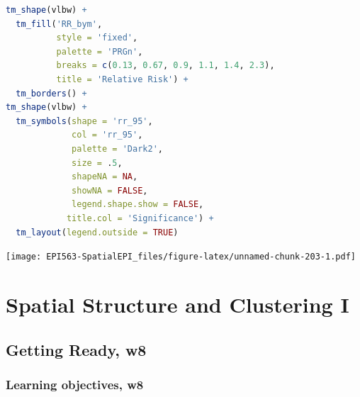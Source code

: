 \documentclass[
]{book}
\begin{document}
\begin{lstlisting}[language=R]
tm_shape(vlbw) +
  tm_fill('RR_bym',
          style = 'fixed',
          palette = 'PRGn',
          breaks = c(0.13, 0.67, 0.9, 1.1, 1.4, 2.3),
          title = 'Relative Risk') +
  tm_borders() + 
tm_shape(vlbw) + 
  tm_symbols(shape = 'rr_95',
             col = 'rr_95',
             palette = 'Dark2',
             size = .5,
             shapeNA = NA,
             showNA = FALSE,
             legend.shape.show = FALSE,
            title.col = 'Significance') +
  tm_layout(legend.outside = TRUE)
\end{lstlisting}

\texttt{[image: EPI563-SpatialEPI\_files/figure-latex/unnamed-chunk-203-1.pdf]}

\hypertarget{spatial-structure-and-clustering-i}{%
\chapter{Spatial Structure and Clustering I}\label{spatial-structure-and-clustering-i}}

\hypertarget{getting-ready-w8}{%
\section{Getting Ready, w8}\label{getting-ready-w8}}

\hypertarget{learning-objectives-w8}{%
\subsection{Learning objectives, w8}\label{learning-objectives-w8}}

 
  \providecommand{\huxb}[2]{\arrayrulecolor[RGB]{#1}\global\arrayrulewidth=#2pt}
  \providecommand{\huxvb}[2]{\color[RGB]{#1}\vrule width #2pt}
  \providecommand{\huxtpad}[1]{\rule{0pt}{#1}}
  \providecommand{\huxbpad}[1]{\rule[-#1]{0pt}{#1}}
\end{document}
